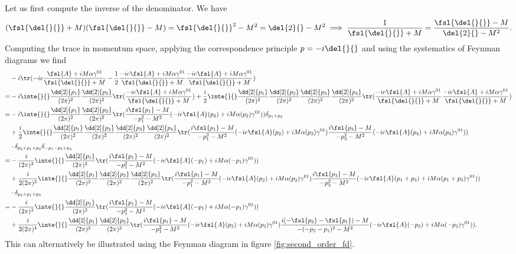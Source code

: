 Let us first compute the inverse of the denominator. We have
\begin{align*}
	(\fsl{\del{}{}} + M)(\fsl{\del{}{}} - M) = \fsl{\del{}{}}^{2} - M^{2} = \del{2}{} - M^{2} \implies \frac{1}{\fsl{\del{}{}} + M} = \frac{\fsl{\del{}{}} - M}{\del{2}{} - M^{2}}.
\end{align*}
Computing the trace in momentum space, applying the correspondence principle $p = -i\del{}{}$ and using the systematics of Feynman diagrams we find
\begin{align*}
	 &-i\tr(-ie\frac{\fsl{A} + iM\alpha\gamma^{01}}{\fsl{\del{}{}} + M} - \frac{1}{2}\frac{-ie\fsl{A} + iM\alpha\gamma^{01}}{\fsl{\del{}{}} + M}\frac{-ie\fsl{A} + iM\alpha\gamma^{01}}{\fsl{\del{}{}} + M}) \\
	=& -i\inte{}{}\frac{\dd[2]{p_{1}}}{(2\pi)^{2}}\frac{\dd[2]{p_{2}}}{(2\pi)^{2}}\tr(\frac{-ie\fsl{A} + iM\alpha\gamma^{01}}{\fsl{\del{}{}} + M}) + \frac{i}{2}\inte{}{}\frac{\dd[2]{p_{1}}}{(2\pi)^{2}}\frac{\dd[2]{p_{2}}}{(2\pi)^{2}}\frac{\dd[2]{p_{3}}}{(2\pi)^{2}}\frac{\dd[2]{p_{4}}}{(2\pi)^{2}}\tr(\frac{-ie\fsl{A} + iM\alpha\gamma^{01}}{\fsl{\del{}{}} + M}\frac{-ie\fsl{A} + iM\alpha\gamma^{01}}{\fsl{\del{}{}} + M}) \\
	=& -i\inte{}{}\frac{\dd[2]{p_{1}}}{(2\pi)^{2}}\frac{\dd[2]{p_{2}}}{(2\pi)^{2}}\tr(\frac{i\fsl{p_{1}} - M}{-p_{1}^{2} - M^{2}}(-ie\fsl{A}(p_{2}) + iM\alpha(p_{2})\gamma^{01}))\delta_{p_{1} + p_{2}} \\
	 &+ \frac{i}{2}\inte{}{}\frac{\dd[2]{p_{1}}}{(2\pi)^{2}}\frac{\dd[2]{p_{2}}}{(2\pi)^{2}}\frac{\dd[2]{p_{3}}}{(2\pi)^{2}}\frac{\dd[2]{p_{4}}}{(2\pi)^{2}}\tr(\frac{i\fsl{p_{1}} - M}{-p_{1}^{2} - M^{2}}(-ie\fsl{A}(p_{2}) + iM\alpha(p_{2})\gamma^{01})\frac{i\fsl{p_{3}} - M}{-p_{3}^{2} - M^{2}}(-ie\fsl{A}(p_{4}) + iM\alpha(p_{4})\gamma^{01})) \\
	 &\cdot\delta_{p_{2} + p_{1} + p_{3}}\delta_{-p_{1} - p_{3} + p_{4}} \\
	=& -\frac{i}{(2\pi)^{2}}\inte{}{}\frac{\dd[2]{p_{1}}}{(2\pi)^{2}}\tr(\frac{i\fsl{p_{1}} - M}{-p_{1}^{2} - M^{2}}(-ie\fsl{A}(-p_{1}) + iM\alpha(-p_{1})\gamma^{01})) \\
	 &+ \frac{i}{2(2\pi)^{2}}\inte{}{}\frac{\dd[2]{p_{1}}}{(2\pi)^{2}}\frac{\dd[2]{p_{2}}}{(2\pi)^{2}}\frac{\dd[2]{p_{3}}}{(2\pi)^{2}}\tr(\frac{i\fsl{p_{1}} - M}{-p_{1}^{2} - M^{2}}(-ie\fsl{A}(p_{2}) + iM\alpha(p_{2})\gamma^{01})\frac{i\fsl{p_{3}} - M}{-p_{3}^{2} - M^{2}}(-ie\fsl{A}(p_{1} + p_{3}) + iM\alpha(p_{1} + p_{3})\gamma^{01})) \\
	 &\cdot\delta_{p_{2} + p_{1} + p_{3}} \\
	=& -\frac{i}{(2\pi)^{2}}\inte{}{}\frac{\dd[2]{p_{1}}}{(2\pi)^{2}}\tr(\frac{i\fsl{p_{1}} - M}{-p_{1}^{2} - M^{2}}(-ie\fsl{A}(-p_{1}) + iM\alpha(-p_{1})\gamma^{01})) \\
	 &+ \frac{i}{2(2\pi)^{4}}\inte{}{}\frac{\dd[2]{p_{1}}}{(2\pi)^{2}}\frac{\dd[2]{p_{2}}}{(2\pi)^{2}}\tr(\frac{i\fsl{p_{1}} - M}{-p_{1}^{2} - M^{2}}(-ie\fsl{A}(p_{2}) + iM\alpha(p_{2})\gamma^{01})\frac{i(-\fsl{p_{2}} - \fsl{p_{1}}) - M}{-(-p_{2} - p_{1})^{2} - M^{2}}(-ie\fsl{A}(-p_{2}) + iM\alpha(-p_{2})\gamma^{01})).
\end{align*}
This can alternatively be illustrated using the Feynman diagram in figure \ref{fig:second_order_fd}.

